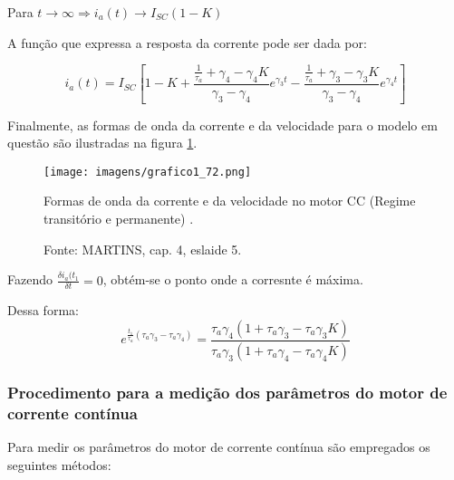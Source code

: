 Para $t \rightarrow \infty \Rightarrow i_{a}(t) \rightarrow I_{SC}(1 - K)$

A função que expressa a resposta da corrente pode ser dada por:

\[i_{a}(t) = I_{SC}\left[1 - K + \frac{\frac{1}{\tau_{a}} + \gamma_{4} - \gamma_{4}K}{\gamma_{3} - \gamma_{4}}e^{\gamma_{3}t} - \frac{\frac{1}{\tau_{a}} + \gamma_{3} - \gamma_{3}K}{\gamma_{3} - \gamma_{4}}e^{\gamma_{4}t}\right]\]

Finalmente, as formas de onda da corrente e da velocidade para o modelo em questão são ilustradas na figura \ref{fig:G1_72}.

\begin{figure}[ht!]
\center
\texttt{[image: imagens/grafico1\_72.png]}
\caption{\label{fig:G1_72} Formas de onda da corrente e da velocidade no motor CC (Regime transitório e permanente) .}
\caption*{Fonte: MARTINS, cap. 4, eslaide 5.}
\end{figure}

Fazendo $\frac{\delta{i_{a}(t_{1}}}{\delta{t}} = 0$, obtém-se o ponto onde a corresnte é máxima.

Dessa forma:
\[ e^{\frac{t_{1}}{\tau_{a}}\left(\tau_{a}\gamma_{3} - \tau_{a}\gamma_{4}\right)} = \frac{\tau_{a}\gamma_{4}\left(1 + \tau_{a}\gamma_{3} - \tau_{a}\gamma_{3}K\right)}{\tau_{a}\gamma_{3}\left(1 + \tau_{a}\gamma_{4} - \tau_{a}\gamma_{4}K\right)}\]

\subsubsection{Procedimento para a medição dos parâmetros do motor de corrente contínua}

Para medir os parâmetros do motor de corrente contínua são empregados os seguintes métodos:


